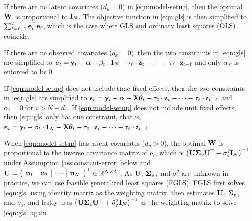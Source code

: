 {	\begin{example}
	    If there are no latent covariates ($d_u = 0$) in \eqref{eqn:model-setup}, then the optimal $\mathbf{W}$ is proportional to $ \mathbf{I}_N$. The objective function in    \eqref{eqn:gls} is then simplified to $\sum_{t =\ell+ 1}^T \mathbf{e}_t^\top \mathbf{e}_t$, which is the case where GLS and ordinary least squares (OLS) coincide. 
	\end{example}
	\begin{example}
	    If there are no observed covariates ($d_x = 0$), then the two constraints in \eqref{eqn:gls} are simplified to $\bm{e}_t =  \mathbf{y}_t - \bm{\alpha} - \beta_t \cdot \bm{1}_N   - \tau_0 \cdot \mathbf{z}_t - \cdots  -  \tau_\ell \cdot \mathbf{z}_{t - \ell} $ and only $\alpha_N$ is enforced to be $0$. 
	\end{example}
	\begin{example}
	    If \eqref{eqn:model-setup} does not include time fixed effects, then the two constraints in \eqref{eqn:gls} are simplified to $\bm{e}_t =  \mathbf{y}_t - \bm{\alpha}  - \mathbf{X} \bm{\theta}_t  - \tau_0 \cdot \mathbf{z}_t - \cdots  -  \tau_\ell \cdot \mathbf{z}_{t - \ell} $ and $ \alpha_i = 0 \text{ for } i > N-d_x $. If \eqref{eqn:model-setup} does not include unit fixed effects, then \eqref{eqn:gls} only has one constraint, that is, $\bm{e}_t =  \mathbf{y}_t  - \beta_t \cdot \bm{1}_N  - \mathbf{X} \bm{\theta}_t   - \tau_0 \cdot \mathbf{z}_t - \cdots  -  \tau_\ell \cdot \mathbf{z}_{t - \ell} $. 
	\end{example}
	}  
	
	
	
	When \eqref{eqn:model-setup} has latent covariates ($d_u > 0$), the optimal $\mathbf{W}$ is  proportional to the inverse covariance matrix of $\bm{e}_t$, which is $\big(\mathbf{U} \mathbf{\Sigma}_v \mathbf{U}^\top + \sigma_\varepsilon^2 \mathbf{I}_N \big)^{-1}$ under Assumption \ref{ass:constant-error} below and $\mathbf{U} = \begin{pmatrix}
	\begin{array}{c|c|c|c}
	     \mathbf{u}_1 & \mathbf{u}_2 & \cdots & \mathbf{u}_N
	\end{array}
	\end{pmatrix}^\top  \in \mathbb{R}^{N \times d_u}$. As $\mathbf{U}$, $\mathbf{\Sigma}_v$, and $\sigma_\varepsilon^2 $ are unknown in practice, we can use feasible generalized least squares (FGLS). FGLS first solves \eqref{eqn:gls} using identity matrix as the weighting matrix, then estimates $\mathbf{U}$, $\mathbf{\Sigma}_v$, and $\sigma_\varepsilon^2 $, and lastly uses $\big(\hat{\mathbf{U}} \hat{\mathbf{\Sigma}}_v \hat{\mathbf{U}}^\top + \hat\sigma_\varepsilon^2 \mathbf{I}_N \big)^{-1}$ as the weighting matrix to solve \eqref{eqn:gls} again. 
	
